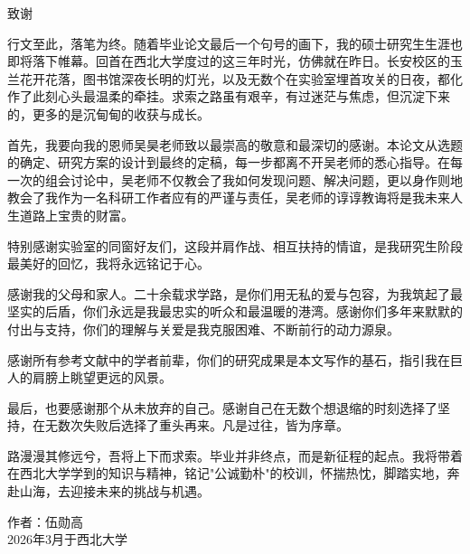 
\newpage
{}
\begin{center}
{\fontsize{15.75pt}{\baselineskip}\selectfont\heiti 致\quad 谢}
\end{center}
\vspace{0.5cm}
\label{sec:thank}

\songti {}
\setlength{\parindent}{2em}
\setlength{\baselineskip}{22pt}

\ifblindthesis
\else
 行文至此，落笔为终。随着毕业论文最后一个句号的画下，我的硕士研究生生涯也即将落下帷幕。回首在西北大学度过的这三年时光，仿佛就在昨日。长安校区的玉兰花开花落，图书馆深夜长明的灯光，以及无数个在实验室埋首攻关的日夜，都化作了此刻心头最温柔的牵挂。求索之路虽有艰辛，有过迷茫与焦虑，但沉淀下来的，更多的是沉甸甸的收获与成长。

首先，我要向我的恩师吴昊老师致以最崇高的敬意和最深切的感谢。本论文从选题的确定、研究方案的设计到最终的定稿，每一步都离不开吴老师的悉心指导。在每一次的组会讨论中，吴老师不仅教会了我如何发现问题、解决问题，更以身作则地教会了我作为一名科研工作者应有的严谨与责任，吴老师的谆谆教诲将是我未来人生道路上宝贵的财富。

特别感谢实验室的同窗好友们，这段并肩作战、相互扶持的情谊，是我研究生阶段最美好的回忆，我将永远铭记于心。

感谢我的父母和家人。二十余载求学路，是你们用无私的爱与包容，为我筑起了最坚实的后盾，你们永远是我最忠实的听众和最温暖的港湾。感谢你们多年来默默的付出与支持，你们的理解与关爱是我克服困难、不断前行的动力源泉。

感谢所有参考文献中的学者前辈，你们的研究成果是本文写作的基石，指引我在巨人的肩膀上眺望更远的风景。

最后，也要感谢那个从未放弃的自己。感谢自己在无数个想退缩的时刻选择了坚持，在无数次失败后选择了重头再来。凡是过往，皆为序章。

路漫漫其修远兮，吾将上下而求索。毕业并非终点，而是新征程的起点。我将带着在西北大学学到的知识与精神，铭记"公诚勤朴"的校训，怀揣热忱，脚踏实地，奔赴山海，去迎接未来的挑战与机遇。

    \vspace{2cm} %

    \begin{flushright}
    作\quad 者：伍勋高 \\
        2026年3月于西北大学
    \end{flushright}
\fi
